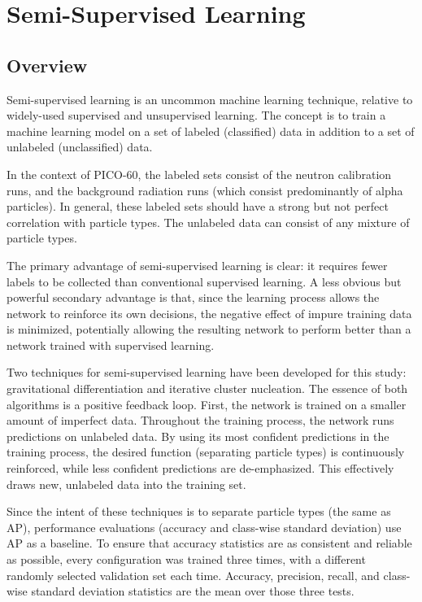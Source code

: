 \documentclass[10pt]{article}
\begin{document}
\section{Semi-Supervised Learning} \label{semi_supervised}

\subsection{Overview}

Semi-supervised learning is an uncommon machine learning technique, relative to widely-used supervised and unsupervised learning. The concept is to train a machine learning model on a set of labeled (classified) data in addition to a set of unlabeled (unclassified) data.

In the context of PICO-60, the labeled sets consist of the neutron calibration runs, and the background radiation runs (which consist predominantly of alpha particles). In general, these labeled sets should have a strong but not perfect correlation with particle types. The unlabeled data can consist of any mixture of particle types.

The primary advantage of semi-supervised learning is clear: it requires fewer labels to be collected than conventional supervised learning. A less obvious but powerful secondary advantage is that, since the learning process allows the network to reinforce its own decisions, the negative effect of impure training data is minimized, potentially allowing the resulting network to perform better than a network trained with supervised learning.

Two techniques for semi-supervised learning have been developed for this study: gravitational differentiation and iterative cluster nucleation. The essence of both algorithms is a positive feedback loop. First, the network is trained on a smaller amount of imperfect data. Throughout the training process, the network runs predictions on unlabeled data. By using its most confident predictions in the training process, the desired function (separating particle types) is continuously reinforced, while less confident predictions are de-emphasized. This effectively draws new, unlabeled data into the training set.

Since the intent of these techniques is to separate particle types (the same as AP), performance evaluations (accuracy and class-wise standard deviation) use AP as a baseline. To ensure that accuracy statistics are as consistent and reliable as possible, every configuration was trained three times, with a different randomly selected validation set each time. Accuracy, precision, recall, and class-wise standard deviation statistics are the mean over those three tests.
\end{document}
